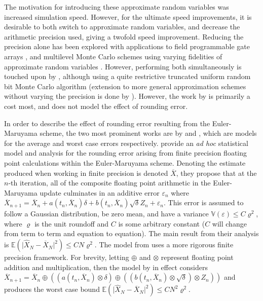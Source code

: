 \documentclass[manuscript,review]{acmart}
\begin{document}
The motivation for introducing these approximate random variables was increased simulation speed. However, for the ultimate speed improvements, it is desirable to both switch to approximate random variables, and decrease the arithmetic precision used, giving a twofold speed improvement. Reducing the precision alone has been explored with applications to field programmable gate arrays  \citep{brugger2014mixed,omland2015exploiting,omland2016mixed,chow2012mixed}, and multilevel Monte Carlo schemes using varying fidelities of approximate random variables \citep{muller1958inverse}. However, performing both simultaneously is touched upon by \citet{giles2019random_multilevel}, although using a quite restrictive truncated uniform random bit Monte Carlo algorithm (extension to more general approximation schemes without varying the precision is done by \citet{giles2020approximate}). However, the work by \citet{giles2019random_multilevel} is primarily a cost most, and does not model the effect of rounding error. 


In order to describe the effect of rounding error resulting from the Euler-Maruyama scheme, the two most prominent works are by \citet{arciniega2003rounding} and \citet{omland2016mixed}, which are models for the average and worst case errors respectively. \citet{arciniega2003rounding} provide an \textit{ad hoc} statistical model and analysis for the rounding error arising from finite precision floating point calculations within the Euler-Maruyama scheme. Denoting the estimate produced when working in finite precision is denoted $ \overline{X} $, they propose that at the $ n $-th iteration, all of the composite floating point arithmetic in the Euler-Maruyama update culminates in an additive error $ \varepsilon_n $ where
$ \overline{X}_{n+1} = \overline{X}_n + a(t_n, \overline{X}_n) \delta + b(t_n, \overline{X}_n)\sqrt{\delta} Z_n + \varepsilon_n $.
This error is assumed to follow a Gaussian distribution, be zero mean, and have a variance $ \mathbb{V}(\varepsilon) \leq C \varrho^2 $, where $ \varrho $ is the unit roundoff and $ C $ is some arbitrary constant ($ C $ will change from term to term and equation to equation). The main result from their analysis \citep[theorem~2.2]{arciniega2003rounding} is $ \mathbb{E}(\lvert \widehat{X}_N - \overline{X}_N \rvert^2) \leq  CN\varrho^2 $. The model from \citet{omland2016mixed} uses a more rigorous finite precision framework. For brevity, letting $ \oplus $ and $ \otimes $ represent floating point addition and multiplication, then the model by \citet{omland2016mixed} in effect considers $ \overline{X}_{n+1} = \overline{X}_n \oplus ((a(t_n, \overline{X}_n) \otimes \delta) \oplus ((b(t_n, \overline{X}_n)\otimes \sqrt{\delta})\otimes Z_n)) $ and produces the worst case bound $ \mathbb{E}(\lvert \widehat{X}_N - \overline{X}_N \rvert^2) \leq  CN^2\varrho^2 $.
\end{document}
